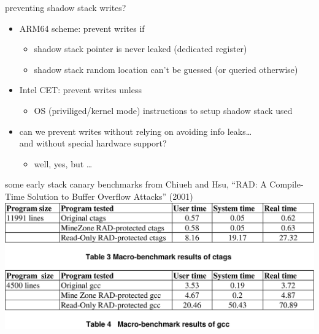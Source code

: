 \begin{frame}{preventing shadow stack writes?}
\begin{itemize}
\item ARM64 scheme: prevent writes if
    \begin{itemize}
    \item shadow stack pointer is never leaked (dedicated register)
    \item shadow stack random location can't be guessed (or queried otherwise)
    \end{itemize}
\item Intel CET: prevent writes unless
    \begin{itemize}
    \item OS (priviliged/kernel mode) instructions to setup shadow stack used
    \end{itemize}
\vspace{.5cm}
\item can we prevent writes without relying on avoiding info leaks\ldots \\
      and without special hardware support?
      \begin{itemize}
      \item well, yes, but \ldots
      \end{itemize}
\end{itemize}
\end{frame}

\begin{frame}{some early stack canary benchmarks}
{\small from Chiueh and Hsu, ``RAD: A Compile-Time Solution to Buffer Overflow Attacks'' (2001)}
\includegraphics[height=0.8\textheight]{../mitigate/rad-results}
\end{frame}

